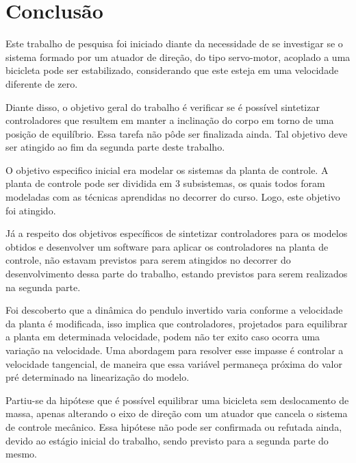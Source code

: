 \chapter{Conclusão}    \label{chp:conclusão}

    Este trabalho de pesquisa foi iniciado diante da necessidade de se investigar se o sistema formado por um atuador de direção, do tipo servo-motor, acoplado a uma bicicleta pode ser estabilizado, considerando que este esteja em uma velocidade diferente de zero.

    Diante disso, o objetivo geral do trabalho é verificar se é possível sintetizar controladores que resultem em manter a inclinação do corpo em torno de uma posição de equilíbrio. Essa tarefa não pôde ser finalizada ainda. Tal objetivo deve ser atingido ao fim da segunda parte deste trabalho.
    
    O objetivo especifico inicial era modelar os sistemas da planta de controle. A planta de controle pode ser dividida em 3 subsistemas, os quais todos foram modeladas com as técnicas aprendidas no decorrer do curso. Logo, este objetivo foi atingido.
    
    Já a respeito dos objetivos específicos de sintetizar controladores para os modelos obtidos e desenvolver um software para aplicar os controladores na planta de controle, não estavam previstos para serem atingidos no decorrer do desenvolvimento dessa parte do trabalho, estando previstos para serem realizados na segunda parte.
    
    Foi descoberto que a dinâmica do pendulo invertido varia conforme a velocidade da planta é modificada, isso implica que controladores, projetados para equilibrar a planta em determinada velocidade, podem não ter exito  caso ocorra uma variação na velocidade. Uma abordagem para resolver esse impasse é controlar a velocidade tangencial, de maneira que essa variável permaneça próxima do valor pré determinado na linearização do modelo.
    
    Partiu-se da hipótese que é possível equilibrar uma bicicleta sem deslocamento de massa, apenas alterando o eixo de direção com um atuador que cancela o sistema de controle mecânico. Essa hipótese não pode ser confirmada ou refutada ainda, devido ao estágio inicial do trabalho, sendo previsto para a segunda parte do mesmo.
    

